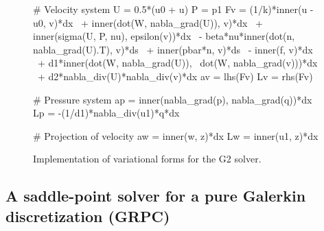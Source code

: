 \begin{figure}
\bwfig
\begin{python}
# Velocity system
U = 0.5*(u0 + u)
P = p1
Fv = (1/k)*inner(u - u0, v)*dx \
   + inner(dot(W, nabla_grad(U)), v)*dx \
   + inner(sigma(U, P, nu), epsilon(v))*dx \
   - beta*nu*inner(dot(n, nabla_grad(U).T), v)*ds \
   + inner(pbar*n, v)*ds \
   - inner(f, v)*dx \
   + d1*inner(dot(W, nabla_grad(U)), \
              dot(W, nabla_grad(v)))*dx \
   + d2*nabla_div(U)*nabla_div(v)*dx
av = lhs(Fv)
Lv = rhs(Fv)

# Pressure system
ap = inner(nabla_grad(p), nabla_grad(q))*dx
Lp = -(1/d1)*nabla_div(u1)*q*dx

# Projection of velocity
aw = inner(w, z)*dx
Lw = inner(u1, z)*dx
\end{python}
\caption{Implementation of variational forms for the G2 solver.}
\label{fig:g2_code}
\end{figure}

\subsection{A saddle-point solver for a pure Galerkin discretization (GRPC)}
\index{GRPC}

